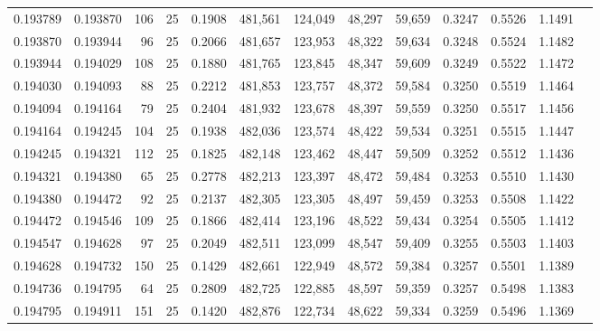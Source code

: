 \begin{tabular}{rrrrrrrrrrrrr}
0.193789 & 0.193870 &   106 &  25 &                                     0.1908 & 481,561 & 124,049 &  48,297 &  59,659 & 0.3247 & 0.5526 & 1.1491 \\
0.193870 & 0.193944 &    96 &  25 &                                     0.2066 & 481,657 & 123,953 &  48,322 &  59,634 & 0.3248 & 0.5524 & 1.1482 \\
0.193944 & 0.194029 &   108 &  25 &                                     0.1880 & 481,765 & 123,845 &  48,347 &  59,609 & 0.3249 & 0.5522 & 1.1472 \\
0.194030 & 0.194093 &    88 &  25 &                                     0.2212 & 481,853 & 123,757 &  48,372 &  59,584 & 0.3250 & 0.5519 & 1.1464 \\
0.194094 & 0.194164 &    79 &  25 &                                     0.2404 & 481,932 & 123,678 &  48,397 &  59,559 & 0.3250 & 0.5517 & 1.1456 \\
0.194164 & 0.194245 &   104 &  25 &                                     0.1938 & 482,036 & 123,574 &  48,422 &  59,534 & 0.3251 & 0.5515 & 1.1447 \\
0.194245 & 0.194321 &   112 &  25 &                                     0.1825 & 482,148 & 123,462 &  48,447 &  59,509 & 0.3252 & 0.5512 & 1.1436 \\
0.194321 & 0.194380 &    65 &  25 &                                     0.2778 & 482,213 & 123,397 &  48,472 &  59,484 & 0.3253 & 0.5510 & 1.1430 \\
0.194380 & 0.194472 &    92 &  25 &                                     0.2137 & 482,305 & 123,305 &  48,497 &  59,459 & 0.3253 & 0.5508 & 1.1422 \\
0.194472 & 0.194546 &   109 &  25 &                                     0.1866 & 482,414 & 123,196 &  48,522 &  59,434 & 0.3254 & 0.5505 & 1.1412 \\
0.194547 & 0.194628 &    97 &  25 &                                     0.2049 & 482,511 & 123,099 &  48,547 &  59,409 & 0.3255 & 0.5503 & 1.1403 \\
0.194628 & 0.194732 &   150 &  25 &                                     0.1429 & 482,661 & 122,949 &  48,572 &  59,384 & 0.3257 & 0.5501 & 1.1389 \\
0.194736 & 0.194795 &    64 &  25 &                                     0.2809 & 482,725 & 122,885 &  48,597 &  59,359 & 0.3257 & 0.5498 & 1.1383 \\
0.194795 & 0.194911 &   151 &  25 &                                     0.1420 & 482,876 & 122,734 &  48,622 &  59,334 & 0.3259 & 0.5496 & 1.1369 \\

\end{tabular}

